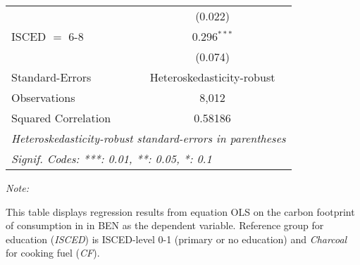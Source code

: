 \begin{table}[htbp!]
\begin{adjustbox}{width = 1\textwidth, max height = 0.95\textheight, center}
\begin{threeparttable}[b]
\begin{tabular}{lc}
                                & (0.022)\\   
            ISCED $=$ 6-8       & 0.296$^{***}$\\   
                                & (0.074)\\   
            \midrule 
            Standard-Errors     & Heteroskedasticity-robust \\   
            Observations        & 8,012\\  
            Squared Correlation & 0.58186\\  
            \midrule \midrule
            \multicolumn{2}{l}{\emph{Heteroskedasticity-robust standard-errors in parentheses}}\\
            \multicolumn{2}{l}{\emph{Signif. Codes: ***: 0.01, **: 0.05, *: 0.1}}\\
         \end{tabular}
         
         \begin{tablenotes}\item \medskip \textit{Note:}
            \item This table displays regression results from equation OLS on the carbon footprint of consumption in  in BEN as the dependent variable.  Reference group for education (\textit{ISCED}) is ISCED-level 0-1 (primary or no education) and \textit{Charcoal} for cooking fuel (\textit{CF}).
         \end{tablenotes}
      \end{threeparttable}
   \end{adjustbox}
\end{table}


